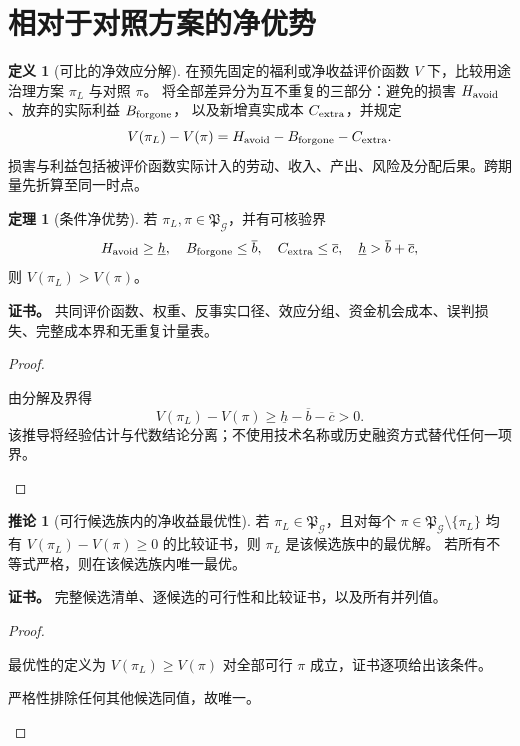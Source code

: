 \documentclass[UTF8,12pt,a4paper,openany,fontset=none,zihao=false]{ctexrep}
\theoremstyle{definition}
\newtheorem{definition}{定义}[chapter]
\newtheorem{theorem}{定理}[chapter]
\newtheorem{corollary}{推论}[chapter]
\newenvironment{certificate}{\par\noindent\textbf{证书。}\ignorespaces}{\par}
\newcommand{\1}{\mathbf 1}
\begin{document}
\section{相对于对照方案的净优势}

\begin{definition}[可比的净效应分解]
在预先固定的福利或净收益评价函数 \(V\) 下，比较用途治理方案 \(\pi_L\) 与对照 \(\pi\)。
将全部差异分为互不重复的三部分：避免的损害 \(H_{\rm avoid}\)、放弃的实际利益 \(B_{\rm forgone}\)，
以及新增真实成本 \(C_{\rm extra}\)，并规定
\[
V(\pi_L)-V(\pi)
=H_{\rm avoid}-B_{\rm forgone}-C_{\rm extra}.
\]
损害与利益包括被评价函数实际计入的劳动、收入、产出、风险及分配后果。跨期量先折算至同一时点。
\end{definition}

\begin{theorem}[条件净优势]
\label{opt:net}
若 \(\pi_L,\pi\in\mathfrak P_{\mathcal G}\)，并有可核验界
\[
H_{\rm avoid}\ge\underline h,
\quad B_{\rm forgone}\le\overline b,
\quad C_{\rm extra}\le\overline c,
\quad\underline h>\overline b+\overline c,
\]
则 \(V(\pi_L)>V(\pi)\)。
\end{theorem}
\begin{certificate}
共同评价函数、权重、反事实口径、效应分组、资金机会成本、误判损失、完整成本界和无重复计量表。
\end{certificate}
\begin{proof}
\begin{semanticsteps}
\item 由分解及界得
\[
V(\pi_L)-V(\pi)
\ge\underline h-\overline b-\overline c>0.
\]
该推导将经验估计与代数结论分离；不使用技术名称或历史融资方式替代任何一项界。
\end{semanticsteps}
\end{proof}

\begin{corollary}[可行候选族内的净收益最优性]
\label{opt:welfare}
若 \(\pi_L\in\mathfrak P_{\mathcal G}\)，且对每个 \(\pi\in\mathfrak P_{\mathcal G}\setminus\{\pi_L\}\) 均有
\(V(\pi_L)-V(\pi)\ge0\) 的比较证书，则 \(\pi_L\) 是该候选族中的最优解。
若所有不等式严格，则在该候选族内唯一最优。
\end{corollary}
\begin{certificate}
完整候选清单、逐候选的可行性和比较证书，以及所有并列值。
\end{certificate}
\begin{proof}
\begin{semanticsteps}
\item 最优性的定义为 \(V(\pi_L)\ge V(\pi)\) 对全部可行 \(\pi\) 成立，证书逐项给出该条件。
\item 严格性排除任何其他候选同值，故唯一。
\end{semanticsteps}
\end{proof}
\end{document}
